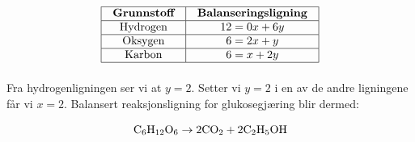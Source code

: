 
$$\vbox{\offinterlineskip
\halign{\strut
\vrule \quad\hfil # \ \hfil & 
\vrule \quad\hfil # \ \hfil \vrule \cr
\noalign{\hrule}
%
{\bf Grunnstoff} & {\bf Balanseringsligning} \cr
%
\noalign{\hrule}
%
Hydrogen & $12 = 0x + 6y$ \cr
%
\noalign{\hrule}
%
Oksygen & $6 = 2x + y$ \cr
%
\noalign{\hrule}
%
Karbon & $6 = x + 2y$ \cr
%
\noalign{\hrule}
} %
}$$ %

Fra hydrogenligningen ser vi at $y = 2$. Setter vi $y = 2$ i en av de andre ligningene får vi $x = 2$. Balansert reaksjonsligning for glukosegjæring blir dermed:

$$\hbox{C}_6 \hbox{H}_{12} \hbox{O}_6 \to 2 \hbox{CO}_2 + 2 \hbox{C}_2 \hbox{H}_5 \hbox{OH}$$



